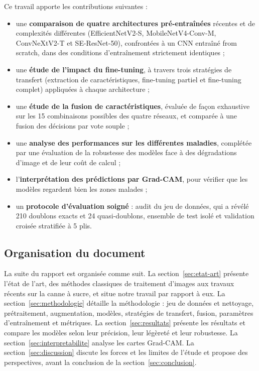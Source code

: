 Ce travail apporte les contributions suivantes :
\begin{itemize}
  \item une \textbf{comparaison de quatre architectures pré-entraînées} récentes et de complexités différentes (EfficientNetV2-S, MobileNetV4-Conv-M, ConvNeXtV2-T et SE-ResNet-50), confrontées à un CNN entraîné from scratch, dans des conditions d'entraînement strictement identiques ;
  \item une \textbf{étude de l'impact du fine-tuning}, à travers trois stratégies de transfert (extraction de caractéristiques, fine-tuning partiel et fine-tuning complet) appliquées à chaque architecture ;
  \item une \textbf{étude de la fusion de caractéristiques}, évaluée de façon exhaustive sur les 15 combinaisons possibles des quatre réseaux, et comparée à une fusion des décisions par vote souple ;
  \item une \textbf{analyse des performances sur les différentes maladies}, complétée par une évaluation de la robustesse des modèles face à des dégradations d'image et de leur coût de calcul ;
  \item l'\textbf{interprétation des prédictions par Grad-CAM}, pour vérifier que les modèles regardent bien les zones malades ;
  \item un \textbf{protocole d'évaluation soigné} : audit du jeu de données, qui a révélé 210 doublons exacts et 24 quasi-doublons, ensemble de test isolé et validation croisée stratifiée à 5 plis.
\end{itemize}

\subsection{Organisation du document}

La suite du rapport est organisée comme suit. La section~\ref{sec:etat-art} présente l'état de l'art, des méthodes classiques de traitement d'images aux travaux récents sur la canne à sucre, et situe notre travail par rapport à eux. La section~\ref{sec:methodologie} détaille la méthodologie : jeu de données et nettoyage, prétraitement, augmentation, modèles, stratégies de transfert, fusion, paramètres d'entraînement et métriques. La section~\ref{sec:resultats} présente les résultats et compare les modèles selon leur précision, leur légèreté et leur robustesse. La section~\ref{sec:interpretabilite} analyse les cartes Grad-CAM. La section~\ref{sec:discussion} discute les forces et les limites de l'étude et propose des perspectives, avant la conclusion de la section~\ref{sec:conclusion}.
